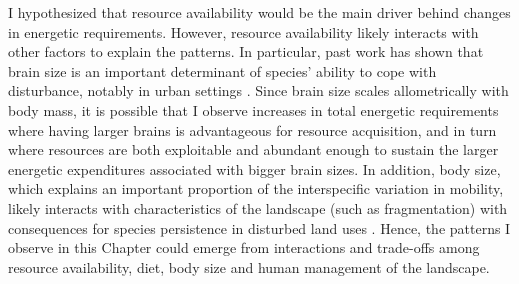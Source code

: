 I hypothesized that resource availability would be the main driver behind changes in energetic requirements. However, resource availability likely interacts with other factors to explain the patterns. In particular, past work has shown that brain size is an important determinant of species' ability to cope with disturbance, notably in urban settings \citep{Sayol2020}. Since brain size scales allometrically with body mass, it is possible that I observe increases in total energetic requirements where having larger brains is advantageous for resource acquisition, and in turn where resources are both exploitable and abundant enough to sustain the larger energetic expenditures associated with bigger brain sizes. In addition, body size, which explains an important proportion of the interspecific variation in mobility, likely interacts with characteristics of the landscape (such as fragmentation) with consequences for species persistence in disturbed land uses \citep{Merckx2018}. Hence, the patterns I observe in this Chapter could emerge from interactions and trade-offs among resource availability, diet, body size and human management of the landscape. 

